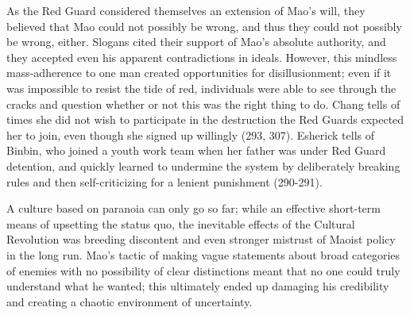 As the Red Guard considered themselves an extension of
Mao's will, they believed that Mao could not possibly be
wrong, and thus they could not possibly be wrong,
either. Slogans cited their support of Mao's absolute
authority, and they accepted even his apparent
contradictions in ideals. However, this mindless
mass-adherence to one man created opportunities for
disillusionment; even if it was impossible to resist the
tide of red, individuals were able to see through the
cracks and question whether or not this was the right
thing to do. Chang tells of times she did not wish to
participate in the destruction the Red Guards expected
her to join, even though she signed up willingly (293,
307). Esherick tells of Binbin, who joined a youth work
team when her father was under Red Guard detention, and
quickly learned to undermine the system by deliberately
breaking rules and then self-criticizing for a lenient
punishment (290-291). 

A culture based on paranoia can only go so far;
while an effective short-term means of upsetting the
status quo, the inevitable effects of the Cultural
Revolution was breeding discontent and even stronger
mistrust of Maoist policy in the long run. Mao's
tactic of making vague statements about broad
categories of enemies with no possibility of clear
distinctions meant that no one could truly
understand what he wanted; this ultimately ended up
damaging his credibility and creating a chaotic
environment of uncertainty.

